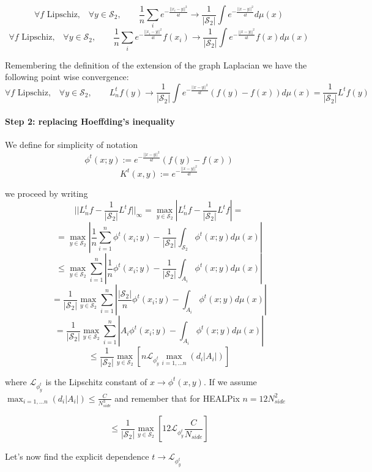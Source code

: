 $$\forall f \text{ Lipschiz,}\quad \forall y\in\mathcal S_2,  \quad\quad \frac{1}{n}\sum_i e^{-\frac{||x_i-y||^2}{4t}}\rightarrow \frac{1}{|\mathcal S_2|}\int e^{-\frac{||x-y||^2}{4t}}d\mu(x)$$
$$\forall f \text{ Lipschiz,}\quad \forall y\in\mathcal S_2,  \quad\quad \frac{1}{n}\sum_i e^{-\frac{||x_i-y||^2}{4t}}f(x_i)\rightarrow \frac{1}{|\mathcal S_2|}\int e^{-\frac{||x-y||^2}{4t}}f(x)d\mu(x)$$

Remembering the definition of the extension of the graph Laplacian we have the following point wise convergence:
$$\forall f \text{ Lipschiz,}\quad \forall y\in\mathcal S_2,  \quad\quad L_n^tf(y)\rightarrow \frac{1}{|\mathcal S_2|}\int e^{-\frac{||x-y||^2}{4t}}\left(f(y)-f(x)\right)d\mu(x) = \frac{1}{|\mathcal S_2|} L^tf(y)$$
\paragraph{Step 2: replacing Hoeffding's inequality}
We define for simplicity of notation
$$\phi^t(x;y) := e^{-\frac{||x-y||^2}{4t}}\left(f(y)-f(x)\right)$$
$$K^t(x,y) :=  e^{-\frac{||x-y||^2}{4t}}$$

we proceed by writing
$$||L_n^tf-\frac{1}{|\mathcal S_2|}L^tf||_\infty = \max _{y\in \mathcal S_2} \left|L_n^tf-\frac{1}{|\mathcal S_2|}L^tf\right|=$$
$$= \max _{y\in \mathcal S_2} \left| \frac{1}{n} \sum_{i=1}^n \phi^t(x_i; y)-\frac{1}{|\mathcal S_2|} \int_{\mathcal S_2} \phi^t(x;y)d\mu(x) \right|$$
$$\leq \max _{y\in \mathcal S_2} \sum_{i=1}^n  \left| \frac{1}{n}  \phi^t(x_i; y)-\frac{1}{|\mathcal S_2|} \int_{A_i} \phi^t(x;y)d\mu(x) \right|$$
$$= \frac{1}{|\mathcal S_2|} \max _{y\in \mathcal S_2} \sum_{i=1}^n  \left| \frac{|\mathcal S_2|}{n}  \phi^t(x_i; y)-\int_{A_i} \phi^t(x;y)d\mu(x) \right|$$
$$= \frac{1}{|\mathcal S_2|} \max _{y\in \mathcal S_2} \sum_{i=1}^n  \left| A_i  \phi^t(x_i; y)-\int_{A_i} \phi^t(x;y)d\mu(x) \right|$$
$$\leq \frac{1}{|\mathcal S_2|} \max _{y\in \mathcal S_2} \left[ n \mathcal L_{\phi^t_y} \max_{i=1,...n} (d_i|A_i|)  \right]$$

where $\mathcal L_{\phi^t_y}$ is the Lipschitz constant of $x \rightarrow \phi^t(x, y)$. If we assume $\max_{i=1,...n} (d_i|A_i|) \leq \frac{C}{N_{side}^3}$
and remember that for HEALPix $n=12N_{side}^2$

$$\leq \frac{1}{|\mathcal S_2|} \max _{y\in \mathcal S_2} \left[ 12 \mathcal L_{\phi^t_y} \frac{C}{N_{side}} \right]$$

Let's now find the explicit dependence $t\rightarrow \mathcal L_{\phi^t_y}$

